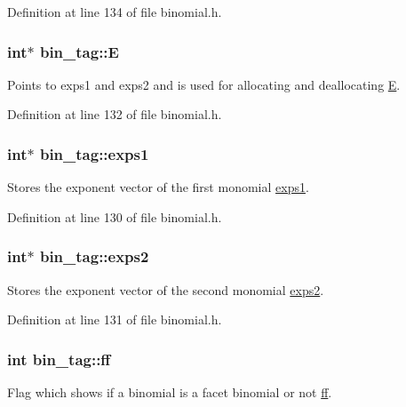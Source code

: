 Definition at line 134 of file binomial.\-h.

\hypertarget{structbin__tag_a89efbcb4dffe5122a3ab5b201b026aa4}{
\subsubsection[{E}]{\setlength{\rightskip}{0pt plus 5cm}int$\ast$ bin\-\_\-tag\-::\-E}}\label{structbin__tag_a89efbcb4dffe5122a3ab5b201b026aa4}
Points to exps1 and exps2 and is used for allocating and deallocating \hyperlink{structbin__tag_a89efbcb4dffe5122a3ab5b201b026aa4}{E}. 

Definition at line 132 of file binomial.\-h.

\hypertarget{structbin__tag_a24714f76bda2e3822def9064310b9f5d}{
\subsubsection[{exps1}]{\setlength{\rightskip}{0pt plus 5cm}int$\ast$ bin\-\_\-tag\-::exps1}}\label{structbin__tag_a24714f76bda2e3822def9064310b9f5d}
Stores the exponent vector of the first monomial \hyperlink{structbin__tag_a24714f76bda2e3822def9064310b9f5d}{exps1}. 

Definition at line 130 of file binomial.\-h.

\hypertarget{structbin__tag_a3e916a57631abe0bfd2774953956c2b4}{
\subsubsection[{exps2}]{\setlength{\rightskip}{0pt plus 5cm}int$\ast$ bin\-\_\-tag\-::exps2}}\label{structbin__tag_a3e916a57631abe0bfd2774953956c2b4}
Stores the exponent vector of the second monomial \hyperlink{structbin__tag_a3e916a57631abe0bfd2774953956c2b4}{exps2}. 

Definition at line 131 of file binomial.\-h.

\hypertarget{structbin__tag_a8c2bf8adf54a9ff4c784837a16f5f171}{
\subsubsection[{ff}]{\setlength{\rightskip}{0pt plus 5cm}int bin\-\_\-tag\-::ff}}\label{structbin__tag_a8c2bf8adf54a9ff4c784837a16f5f171}
Flag which shows if a binomial is a facet binomial or not \hyperlink{structbin__tag_a8c2bf8adf54a9ff4c784837a16f5f171}{ff}. 

